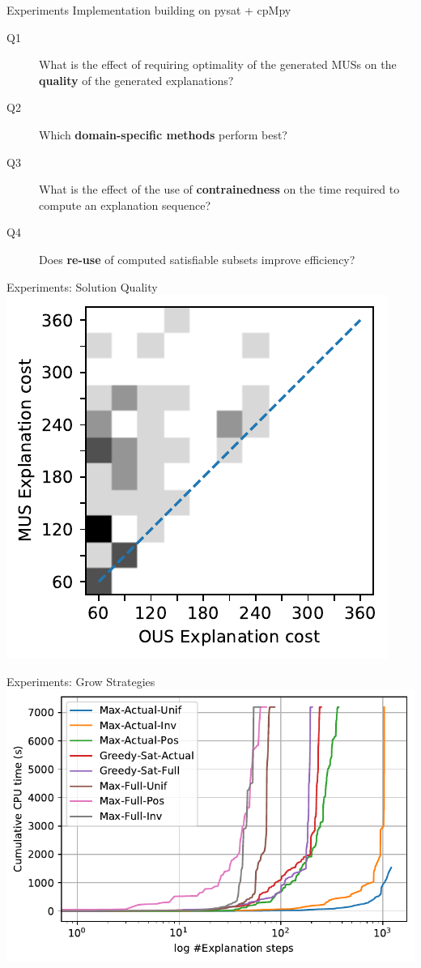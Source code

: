\documentclass[12pt,aspectratio=169]{beamer}
\begin{document}
\begin{frame}{Experiments}
Implementation building on pysat + cpMpy 
\begin{description}
 \item[Q1] What is the effect of requiring optimality of the generated MUSs on the \textbf{quality} of the generated explanations?
 \item[Q2] Which \textbf{domain-specific \grow methods} perform best?
 \item[Q3] What is the effect of the use of \textbf{contrainedness} on the time required to compute an explanation sequence?
 \item[Q4] Does \textbf{re-use} of computed satisfiable subsets improve efficiency?
\end{description}
\end{frame}


\begin{frame}{Experiments: Solution Quality}
  \centering
  \includegraphics[width=0.54\columnwidth]{figures/rq1_heatmap.pdf}
\end{frame}

\begin{frame}{Experiments: Grow Strategies}
  \centering
   \includegraphics[width=0.8\columnwidth]{figures/loggrowWithSubsetmax.pdf}

\end{frame}
\end{document}
